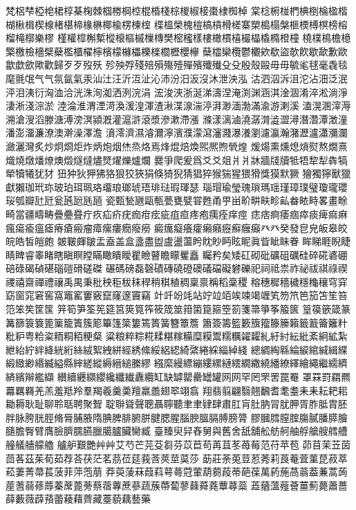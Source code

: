 梵梠梺椏梍桾椁棊椈棘椢椦棡椌棍棔棧棕椶椒椄棗棣椥棹
棠棯椨椪椚椣椡棆楹楷楜楸楫楔楾楮椹楴椽楙椰楡楞楝榁
楪榲榮槐榿槁槓榾槎寨槊槝榻槃榧樮榑榠榜榕榴槞槨樂樛
槿權槹槲槧樅榱樞槭樔槫樊樒櫁樣樓橄樌橲樶橸橇橢橙橦
橈樸樢檐檍檠檄檢檣檗蘗檻櫃櫂檸檳檬櫞櫑櫟檪櫚櫪櫻欅
蘖櫺欒欖鬱欟欸欷盜欹飮歇歃歉歐歙歔歛歟歡歸⽍歹歿殀
殄殃殍殘殕殞殤殪殫殯殲殱⽎殳殷殼毆⽏毋毓毟毬毫毳毯
麾氈氓⽓气氛氤氣汞汕汢汪沂沍沚沁沛汾汨汳沒沐泄泱泓
沽泗泅泝沮沱沾沺泛泯泙泪洟衍洶洫洽洸洙洵洳洒洌浣涓
浤浚浹浙涎涕濤涅淹渕渊涵淇淦涸淆淬淞淌淨淒淅淺淙淤
淕淪淮渭湮渮渙湲湟渾渣湫渫湶湍渟湃渺湎渤滿渝游溂溪
溘滉溷滓溽溯滄溲滔滕溏溥滂溟潁漑灌滬滸滾漿滲漱滯漲
滌漾漓滷澆潺潸澁澀潯潛濳潭澂潼潘澎澑濂潦澳澣澡澤澹
濆澪濟濕濬濔濘濱濮濛瀉瀋濺瀑瀁瀏濾瀛瀚潴瀝瀘瀟瀰瀾
瀲灑灣炙炒炯烱炬炸炳炮烟烋烝烙焉烽焜焙煥煕熈煦煢煌
煖煬熏燻熄熕熨熬燗熹熾燒燉燔燎燠燬燧燵燼燹燿爍爐爛
爨爭爬爰爲⽘爻爼⽙爿牀牆牋牘牴牾犂犁犇犒犖犢犧犹犲
狃狆狄狎狒狢狠狡狹狷倏猗猊猜猖猝猴猯猩猥猾獎獏默獗
獪獨獰獸獵獻獺珈玳珎玻珀珥珮珞璢琅瑯琥珸琲琺瑕琿瑟
瑙瑁瑜瑩瑰瑣瑪瑶瑾璋璞璧瓊瓏瓔珱瓠瓣瓧瓩瓮瓲瓰瓱瓸
瓷甄甃甅甌甎甍甕甓甞甦甬甼畄畍畊畉畛畆畚畩畤畧畫畭
畸當疆疇畴疊疉疂疔疚疝疥疣痂疳痃疵疽疸疼疱痍痊痒痙
痣痞痾痿痼瘁痰痺痲痳瘋瘍瘉瘟瘧瘠瘡瘢瘤瘴瘰瘻癇癈癆
癜癘癡癢癨癩癪癧癬癰癲⽨癶癸發皀皃皈皋皎皖皓皙皚皰
皴皸皹皺盂盍盖盒盞盡盥盧盪蘯盻眈眇眄眩眤眞眥眦眛眷
眸睇睚睨睫睛睥睿睾睹瞎瞋瞑瞠瞞瞰瞶瞹瞿瞼瞽瞻矇矍矗
矚矜矣矮矼砌砒礦砠礪硅碎硴碆硼碚碌碣碵碪碯磑磆磋磔
碾碼磅磊磬磧磚磽磴礇礒礑礙礬礫祀祠祗祟祚祕祓祺祿禊
禝禧齋禪禮禳禹禺秉秕秧秬秡秣稈稍稘稙稠稟禀稱稻稾稷
穃穗穉穡穢穩龝穰穹穽窈窗窕窘窖窩竈窰窶竅竄窿邃竇竊
竍竏竕竓站竚竝竡竢竦竭竰笂笏笊笆笳笘笙笞笵笨笶筐筺
笄筍笋筌筅筵筥筴筧筰筱筬筮箝箘箟箍箜箚箋箒箏筝箙篋
篁篌篏箴篆篝篩簑簔篦篥籠簀簇簓篳篷簗簍篶簣簧簪簟簷
簫簽籌籃籔籏籀籐籘籟籤籖籥籬籵粃粐粤粭粢粫粡粨粳粲
粱粮粹粽糀糅糂糘糒糜糢鬻糯糲糴糶糺紆紂紜紕紊絅絋紮
紲紿紵絆絳絖絎絲絨絮絏絣經綉絛綏絽綛綺綮綣綵緇綽綫
總綢綯緜綸綟綰緘緝緤緞緻緲緡縅縊縣縡縒縱縟縉縋縢繆
繦縻縵縹繃縷縲縺繧繝繖繞繙繚繹繪繩繼繻纃緕繽辮繿纈
纉續纒纐纓纔纖纎纛纜缸缺罅罌罍罎罐⽹网罕罔罘罟罠罨
罩罧罸羂羆羃羈羇羌羔羞羝羚羣羯羲羹羮羶羸譱翅翆翊翕
翔翡翦翩翳翹飜耆耄耋⽾耒耘耙耜耡耨耿耻聊聆聒聘聚聟
聢聨聳聲聰聶聹聽⾀聿肄肆肅肛肓肚肭冐肬胛胥胙胝胄胚
胖脉胯胱脛脩脣脯腋隋腆脾腓腑胼腱腮腥腦腴膃膈膊膀膂
膠膕膤膣腟膓膩膰膵膾膸膽臀臂膺臉臍臑臙臘臈臚臟臠臧
臺臻臾舁舂舅與舊舍舐舖舩舫舸舳艀艙艘艝艚艟艤艢艨艪
艫舮艱艷⾋艸艾芍芒芫芟芻芬苡苣苟苒苴苳苺莓范苻苹苞
茆苜茉苙茵茴茖茲茱荀茹荐荅茯茫茗茘莅莚莪莟莢莖茣莎
莇莊荼莵荳荵莠莉莨菴萓菫菎菽萃菘萋菁菷萇菠菲萍萢萠
莽萸蔆菻葭萪萼蕚蒄葷葫蒭葮蒂葩葆萬葯葹萵蓊葢蒹蒿蒟
蓙蓍蒻蓚蓐蓁蓆蓖蒡蔡蓿蓴蔗蔘蔬蔟蔕蔔蓼蕀蕣蕘蕈蕁蘂
蕋蕕薀薤薈薑薊薨蕭薔薛藪薇薜蕷蕾薐藉薺藏薹藐藕藝藥
